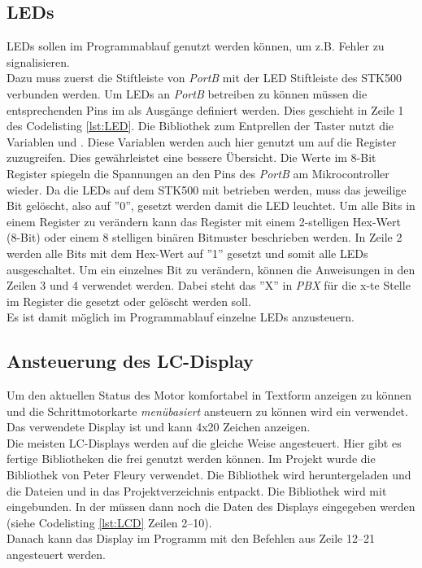 \subsection{LEDs}
\label{sec:LED}
LEDs sollen im Programmablauf genutzt werden können, um z.B. Fehler zu signalisieren.\\
Dazu muss zuerst die Stiftleiste von \emph{PortB} mit der LED Stiftleiste des STK500 verbunden werden. Um LEDs an \emph{PortB} betreiben zu können müssen die entsprechenden Pins im   als Ausgänge definiert werden. Dies geschieht in Zeile 1 des Codelisting \ref{lst:LED}. Die Bibliothek zum Entprellen der Taster nutzt die Variablen  und . Diese Variablen werden auch hier genutzt um auf die Register zuzugreifen. Dies gewährleistet eine bessere Übersicht. Die Werte im 8-Bit Register  spiegeln die Spannungen an den Pins des \emph{PortB} am Mikrocontroller wieder. Da die LEDs auf dem STK500 mit  betrieben werden, muss das jeweilige Bit gelöscht, also auf ''0'', gesetzt werden damit die LED leuchtet. Um alle Bits in einem Register zu verändern kann das Register mit einem 2-stelligen Hex-Wert (8-Bit) oder einem 8 stelligen binären Bitmuster beschrieben werden. In Zeile 2 werden alle Bits mit dem Hex-Wert  auf ''1'' gesetzt und somit alle LEDs ausgeschaltet. Um ein einzelnes Bit zu verändern, können die Anweisungen in den Zeilen 3 und 4 verwendet werden. Dabei steht das ''X'' in \emph{PBX} für die x-te Stelle im Register die gesetzt oder gelöscht werden soll.\\
Es ist damit möglich im Programmablauf einzelne LEDs anzusteuern.
\lstset{language=C, basicstyle=\footnotesize, showstringspaces=false, tabsize=8}


\subsection{Ansteuerung des LC-Display}
\label{sec:LCD}
Um den aktuellen Status des Motor komfortabel in Textform anzeigen zu können und die Schrittmotorkarte \emph{menübasiert} ansteuern zu können wird ein  verwendet. Das verwendete Display ist  und kann 4x20 Zeichen anzeigen.\\
Die meisten LC-Displays werden auf die gleiche Weise angesteuert. Hier gibt es fertige Bibliotheken die frei genutzt werden können. Im Projekt wurde die Bibliothek von Peter Fleury \cite{uC:Fleury} verwendet. Die Bibliothek wird heruntergeladen und die Dateien  und  in das Projektverzeichnis entpackt. Die Bibliothek wird mit  eingebunden. In der  müssen dann noch die Daten des Displays eingegeben werden (siehe Codelisting \ref{lst:LCD} Zeilen 2--10).\\
Danach kann das Display im Programm mit den Befehlen aus Zeile 12--21 angesteuert werden.
\lstset{language=C, basicstyle=\footnotesize, showstringspaces=false, tabsize=8}


